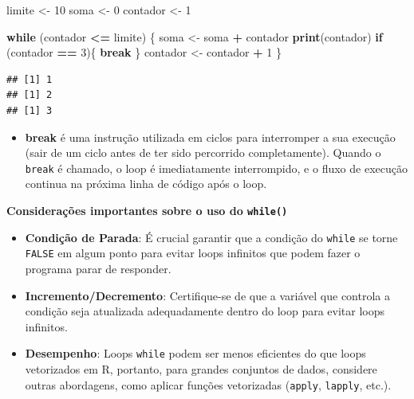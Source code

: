 \documentclass[
]{book}
\newenvironment{Shaded}{\begin{snugshade}}{\end{snugshade}}
\newcommand{\ControlFlowTok}[1]{\textcolor[rgb]{0.13,0.29,0.53}{\textbf{#1}}}
\newcommand{\DecValTok}[1]{\textcolor[rgb]{0.00,0.00,0.81}{#1}}
\newcommand{\FunctionTok}[1]{\textcolor[rgb]{0.13,0.29,0.53}{\textbf{#1}}}
\newcommand{\NormalTok}[1]{#1}
\newcommand{\OtherTok}[1]{\textcolor[rgb]{0.56,0.35,0.01}{#1}}
\newcommand{\SpecialCharTok}[1]{\textcolor[rgb]{0.81,0.36,0.00}{\textbf{#1}}}
\providecommand{\tightlist}{%
  \setlength{\itemsep}{0pt}\setlength{\parskip}{0pt}}
\begin{document}
\begin{Shaded}
\begin{Highlighting}[]
\NormalTok{limite }\OtherTok{\textless{}{-}} \DecValTok{10}
\NormalTok{soma }\OtherTok{\textless{}{-}} \DecValTok{0}
\NormalTok{contador }\OtherTok{\textless{}{-}} \DecValTok{1}

\ControlFlowTok{while}\NormalTok{ (contador }\SpecialCharTok{\textless{}=}\NormalTok{ limite) \{  }
\NormalTok{  soma }\OtherTok{\textless{}{-}}\NormalTok{ soma }\SpecialCharTok{+}\NormalTok{ contador  }
  \FunctionTok{print}\NormalTok{(contador)  }
  \ControlFlowTok{if}\NormalTok{ (contador }\SpecialCharTok{==} \DecValTok{3}\NormalTok{)\{    }
    \ControlFlowTok{break}  
\NormalTok{  \}  }
\NormalTok{  contador }\OtherTok{\textless{}{-}}\NormalTok{ contador }\SpecialCharTok{+} \DecValTok{1}
\NormalTok{\}}
\end{Highlighting}
\end{Shaded}

\begin{verbatim}
## [1] 1
## [1] 2
## [1] 3
\end{verbatim}

\begin{itemize}
\tightlist
\item
  \textbf{break} é uma instrução utilizada em ciclos para interromper a sua execução (sair de um ciclo antes de ter sido percorrido completamente). Quando o \texttt{break} é chamado, o loop é imediatamente interrompido, e o fluxo de execução continua na próxima linha de código após o loop.
\end{itemize}

\textbf{Considerações importantes sobre o uso do \texttt{while()}}

\begin{itemize}
\item
  \textbf{Condição de Parada}: É crucial garantir que a condição do \texttt{while} se torne \texttt{FALSE} em algum ponto para evitar loops infinitos que podem fazer o programa parar de responder.
\item
  \textbf{Incremento/Decremento}: Certifique-se de que a variável que controla a condição seja atualizada adequadamente dentro do loop para evitar loops infinitos.
\item
  \textbf{Desempenho}: Loops \texttt{while} podem ser menos eficientes do que loops vetorizados em R, portanto, para grandes conjuntos de dados, considere outras abordagens, como aplicar funções vetorizadas (\texttt{apply}, \texttt{lapply}, etc.).
\end{itemize}
\end{document}
